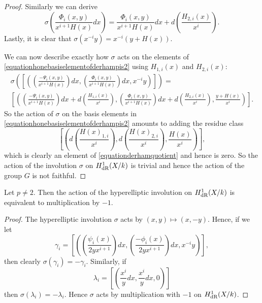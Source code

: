 \begin{proof}
    Similarly we can derive
        \begin{equation*}
        \sigma \left( \frac{\Phi_i(x,y)}{x^{i+1}H(x)} dx \right)  = \frac{\Phi_i(x,y)}{x^{i+1}H(x)} dx + d \left( \frac{H_{2,i}(x)}{x^i} \right).
        \end{equation*}
    Lastly, it is clear that $\sigma(x^{-i}y) = x^{-i}(y+H(x))$.
    
    
    We can now describe exactly how $\sigma$ acts on the elements of \eqref{equationhonebasiselementofderhampis2} using $H_{1,i}(x)$ and $H_{2,i}(x)$:
        \begin{multline*}
        \sigma \left( \left[ \left( \left(\frac{-\Psi_i(x,y)}{x^{i+1}H(x)}\right) dx, \left( \frac{\Phi_i(x,y)}{x^{i+1}H(x)} \right) dx, x^{-i}y \right)\right]\right) = \\
         \left[ \left( \left(\frac{-\Psi_i(x,y)}{x^{i+1}H(x)} \right) dx + d\left(\frac{H_{1,i}(x)}{x^i}\right),  \left( \frac{\Phi_i(x,y)}{x^{i+1}H(x)} \right) dx+ d\left(\frac{H_{2,i}(x)}{x^i} \right), \frac{y+H(x)}{x^i} \right) \right].
        \end{multline*}
    So the action of $\sigma$ on the basis elements in \eqref{equationhonebasiselementofderhampis2} amounts to adding the residue class 
        \[
        \left[ \left( d\left(\frac{H(x)_{1,i}}{x^i}\right), d\left(\frac{H(x)_{2,i}}{x^i}\right), \frac{H(x)}{x^i} \right)\right],
        \]
    which is clearly an element of \eqref{equationderhamquotient} and hence is zero.
    So the action of the involution $\sigma$ on $H_{\text {dR}}^1(X/k)$ is trivial and hence the action of the group $G$ is not faithful.
    \end{proof}

    \begin{cor}\label{corollaryinvolutionisjustmultiplicationbyminus}
    Let $p \neq 2$.
    Then the action of the hyperelliptic involution on $H_{\text {dR}}^1(X/k)$ is equivalent to multiplication by $-1$.
    \end{cor}
    \begin{proof}
    The hyperelliptic involution $\sigma$ acts by $(x,y) \mapsto (x,-y)$.
    Hence, if we let
        \[
        \gamma_i = \left[ \left( \left( \frac{\psi_i(x)}{2yx^{i+1}}\right) dx, \left(\frac{-\phi_i(x)}{2yx^{i+1}}\right) dx, x^{-i}y\right) \right],
        \]
    then clearly $\sigma(\gamma_i) = -\gamma_i$.
    Similarly, if 
        \[
        \lambda_i = \left[ \left( \frac{x^i}{y}dx, \frac{x^i}{y}dx, 0 \right) \right]
        \]
    then $\sigma(\lambda_i) = - \lambda_i$.
    Hence $\sigma$ acts by multiplication with $-1$ on $H_{\text {dR}}^1(X/k)$.
    \end{proof}


